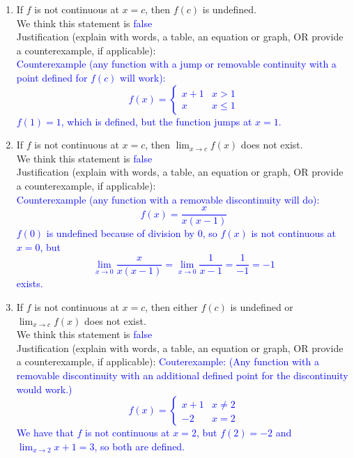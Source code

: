 \documentclass{ximera}
\begin{document}
\begin{exercise}
\begin{enumerate}
        \item If $f$ is not continuous at $x=c$, then $f(c)$ is undefined.\\
        We think this statement is \textcolor{blue}{false}\\
        Justification (explain with words, a table, an equation or graph, OR provide a counterexample, if applicable):\\
        \textcolor{blue}{Counterexample (any function with a jump or removable continuity with a point defined for $f(c)$ will work):\\
        \[f(x)=\begin{cases}
        x+1 & x>1\\
        x & x\leq 1
        \end{cases}\]
        $f(1)=1$, which is defined, but the function jumps at $x=1$.}
        \item If $f$ is not continuous at $x=c$, then $\lim_{x\rightarrow c}f(x)$ does not exist.\\
        We think this statement is \textcolor{blue}{false}\\
        Justification (explain with words, a table, an equation or graph, OR provide a counterexample, if applicable):\\
        \textcolor{blue}{ Counterexample (any function with a removable discontinuity will do):
        \[f(x)=\frac{x}{x(x-1)}\]
        $f(0)$ is undefined because of division by 0, so $f(x)$ is not continuous at $x=0$, but 
        \[\lim_{x\rightarrow 0}\frac{x}{x(x-1)}=\lim_{x\rightarrow 0}\frac{1}{x-1}=\frac{1}{-1}=-1\] exists.}
        \item If $f$ is not continuous at $x=c$, then either $f(c)$ is undefined or $\lim_{x\rightarrow c}f(x)$ does not exist.\\
        We think this statement is \textcolor{blue}{false}\\
        Justification (explain with words, a table, an equation or graph, OR provide a counterexample, if applicable):
        \textcolor{blue}{Couterexample: (Any function with a removable discontinuity with an additional defined point for the discontinuity would work.)
        \[f(x)=
        \begin{cases}
         x+1 &  x\neq 2\\
         -2 & x=2
        \end{cases}\]
        We have that $f$ is not continuous at $x=2$, but $f(2)=-2$ and $\lim_{x\rightarrow 2}x+1=3$, so both are defined.}
        


\end{enumerate}
\end{exercise}
\end{document}
